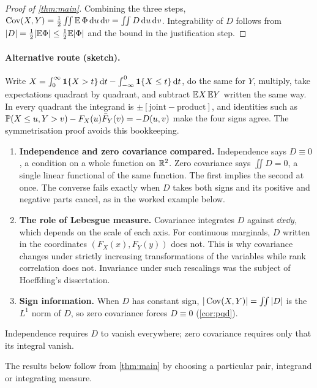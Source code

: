 \documentclass{saim-blog}
\begin{document}
\begin{proof}[Proof of \cref{thm:main}]
Combining the three steps, $\operatorname{Cov}(X,Y)=\tfrac12\iint\mathbb{E}\,\Phi\mathop{}\!\mathrm{d} u\mathop{}\!\mathrm{d} v=\iint D\mathop{}\!\mathrm{d} u\mathop{}\!\mathrm{d} v$. Integrability of $D$ follows from $|D|=\tfrac12|\mathbb{E}\Phi|\le\tfrac12\mathbb{E}|\Phi|$ and the bound in the justification step.
\end{proof}

\paragraph{Alternative route (sketch).}
Write $X=\int_0^\infty\mathbf{1}\{X>t\}\mathop{}\!\mathrm{d} t-\int_{-\infty}^0\mathbf{1}\{X\le t\}\mathop{}\!\mathrm{d} t$, do the same for $Y$, multiply, take expectations quadrant by quadrant, and subtract $\mathbb{E} X\,\mathbb{E} Y$ written the same way. In every quadrant the integrand is $\pm[\text{joint}-\text{product}]$, and identities such as $\mathbb{P}(X\le u,Y>v)-F_X(u)\bar F_Y(v)=-D(u,v)$ make the four signs agree. The symmetrisation proof avoids this bookkeeping.

\SecInsight

\begin{enumerate}
\item \textbf{Independence and zero covariance compared.} Independence says $D\equiv0$, a condition on a whole function on $\mathbb{R}^2$. Zero covariance says $\iint D=0$, a single linear functional of the same function. The first implies the second at once. The converse fails exactly when $D$ takes both signs and its positive and negative parts cancel, as in the worked example below.
\item \textbf{The role of Lebesgue measure.} Covariance integrates $D$ against $\dd x\dd y$, which depends on the scale of each axis. For continuous marginals, $D$ written in the coordinates $(F_X(x),F_Y(y))$ does not. This is why covariance changes under strictly increasing transformations of the variables while rank correlation does not. Invariance under such rescalings was the subject of Hoeffding's dissertation.
\item \textbf{Sign information.} When $D$ has constant sign, $|\operatorname{Cov}(X,Y)|=\iint|D|$ is the $L^1$ norm of $D$, so zero covariance forces $D\equiv0$ (\cref{cor:pqd}).
\end{enumerate}

\begin{pullquote}
Independence requires $D$ to vanish everywhere; zero covariance requires only that its integral vanish.
\end{pullquote}

\SecUses
The results below follow from \cref{thm:main} by choosing a particular pair, integrand or integrating measure.
\end{document}
